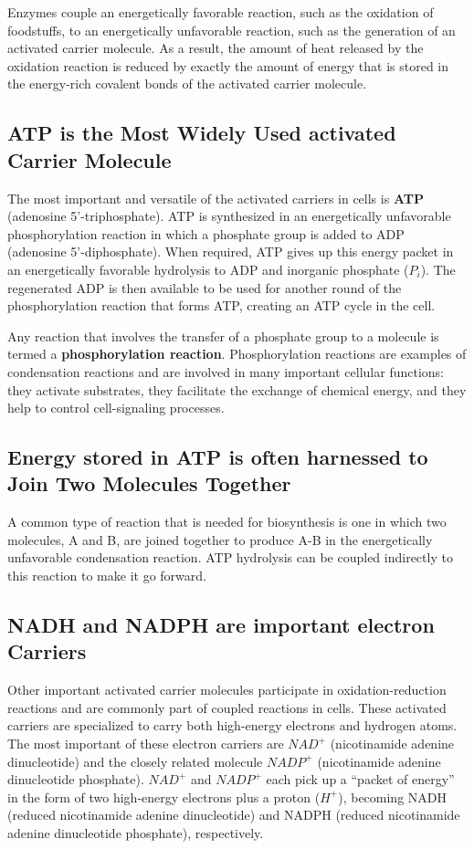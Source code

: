 Enzymes couple an energetically favorable reaction, such
as the oxidation of foodstuffs, to an energetically unfavorable reaction,
such as the generation of an activated carrier molecule. As a result, the
amount of heat released by the oxidation reaction is reduced
by exactly the amount of energy that is stored in the energy-rich covalent bonds
of the activated carrier molecule.

\subsection{ATP is the Most Widely Used activated Carrier Molecule}

The most important and versatile of the activated carriers in cells is
\textbf{ATP} (adenosine 5'-triphosphate). ATP is synthesized in an energetically unfavorable
phosphorylation reaction in which a phosphate group is added to ADP
(adenosine 5'-diphosphate).
When required, ATP gives up this energy
packet in an energetically favorable hydrolysis to ADP and inorganic
phosphate ($P_{i}$). The regenerated ADP is then available to be used for
another round of the phosphorylation reaction that forms ATP, creating
an ATP cycle in the cell.

Any reaction that involves the transfer of a phosphate group to a molecule is termed a
\textbf{phosphorylation reaction}. Phosphorylation reactions are examples of condensation reactions
and are involved in many important cellular functions: they
activate substrates, they facilitate the exchange of chemical energy, and
they help to control cell-signaling processes.

\subsection{Energy stored in ATP is often harnessed to Join Two Molecules Together}

A common type of reaction that is needed for biosynthesis is one in which
two molecules, A and B, are joined together to produce A-B in the energetically
unfavorable condensation reaction. ATP hydrolysis can be coupled indirectly to this
reaction to make it go forward.

\subsection{NADH and NADPH are important electron Carriers}

Other important activated carrier molecules participate in oxidation-reduction
reactions and are commonly part of coupled reactions in cells.
These activated carriers are specialized to carry both high-energy electrons
and hydrogen atoms. The most important of these electron carriers
are \textbf{$NAD^{+}$} (nicotinamide adenine dinucleotide) and the closely related
molecule \textbf{$NADP^{+}$} (nicotinamide adenine dinucleotide phosphate).
$NAD^{+}$ and $NADP^{+}$ each pick up a “packet of energy” in the form of two high-energy
electrons plus a proton ($H^{+}$), becoming NADH (reduced nicotinamide
adenine dinucleotide) and NADPH (reduced nicotinamide adenine dinucleotide
phosphate), respectively.


